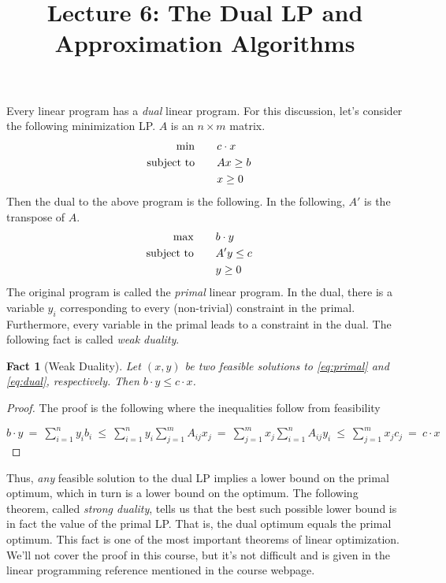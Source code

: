 \documentclass[11pt]{article}
\newtheorem{fact}{Fact}
\begin{document}
\title{Lecture 6:  The Dual LP and Approximation Algorithms}
\author{}
\date{}
\maketitle
\noindent
Every linear program has a {\em dual} linear program. For this discussion, let's consider the following minimization LP. $A$ is an $n\times m$ matrix.
\begin{align}
\min & \qquad c \cdot x & \label{eq:primal} \\
\mbox{subject to} 	&\qquad Ax \ge b & \notag \\
				&\qquad x\ge 0 & \notag
\end{align}
Then the dual to the above program is the following. In the following, $A'$ is the transpose of $A$.
\begin{align}
\max & \qquad b \cdot y & \label{eq:dual} \\
\mbox{subject to} &\qquad A'y \le c & \notag \\
			   & \qquad y \ge 0 & \notag  
\end{align}
\def\x{{x^*}}
\def\y{{y^*}}
\noindent
The original program is called the {\em primal} linear program. 
In the dual, there is a variable $y_i$ corresponding to every (non-trivial) constraint in the primal. Furthermore, every variable in the primal leads to a constraint in the dual. The following fact is called {\em weak duality}.

\begin{fact}[Weak Duality]\label{fact:weakdual}
Let $(x,y)$ be two feasible solutions to \eqref{eq:primal} and \eqref{eq:dual}, respectively. Then
$b\cdot y \le c\cdot x$.
\end{fact}
\begin{proof}
The proof is the following where the inequalities follow from feasibility

$b\cdot y ~ = ~ \sum_{i=1}^n y_ib_i   ~ \le  ~ \sum_{i=1}^ny_i\sum_{j=1}^m A_{ij}x_j 
						    ~ =  ~    \sum_{j=1}^m x_j\sum_{i=1}^n A_{ij}y_i 
						   ~  \le  ~	   \sum_{j=1}^m x_jc_j  ~ =  ~c\cdot x
						    $
\end{proof}

Thus, {\em any} feasible solution to the dual LP implies a lower bound on the primal optimum, which
in turn is a lower bound on the optimum. The following theorem, called {\em strong duality}, tells us that the best such possible lower bound is in fact the value of the primal LP. That is, the dual optimum equals the primal optimum. This fact is  one of the most important theorems of linear optimization. We'll not cover the proof in this course, but it's not difficult and is given in the linear programming reference mentioned in the course webpage. 
\end{document}
